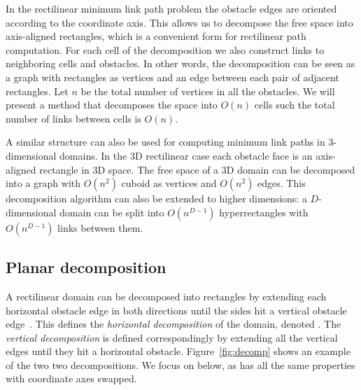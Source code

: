 \documentclass[english,gradu]{tktltiki2018}
\begin{document}

In the rectilinear minimum link path problem the obstacle edges are oriented according to the coordinate axis.
This allows us to decompose the free space into axis-aligned rectangles, which is a convenient form for rectilinear path computation.
For each cell of the decomposition we also construct links to neighboring cells and obstacles.
In other words, the decomposition can be seen as a graph with rectangles as vertices and an edge between each pair of adjacent rectangles.
Let $n$ be the total number of vertices in all the obstacles.
We will present a method that decomposes the space into $O(n)$ cells such the total number of links between cells is $O(n)$.

A similar structure can also be used for computing minimum link paths in 3-dimensional domains.
In the 3D rectilinear case each obstacle face is an axis-aligned rectangle in 3D space.
The free space of a 3D domain can be decomposed into a graph with $O(n^2)$ cuboid as vertices and $O(n^2)$ edges.
This decomposition algorithm can also be extended to higher dimensions: a $D$-dimensional domain can be split into $O(n^{D-1})$ hyperrectangles with $O(n^{D-1})$ links between them.

\subsection{Planar decomposition}\label{sec:decomp2d}

A rectilinear domain can be decomposed into rectangles by extending each horizontal obstacle edge in both directions until the sides hit a vertical obstacle edge~\cite{imai86}.
This defines the \emph{horizontal decomposition} of the domain, denoted .
The \emph{vertical decomposition}  is defined correspondingly by extending all the vertical edges until they hit a horizontal obstacle.
Figure~\ref{fig:decomp} shows an example of the two two decompositions.
We focus on  below, as  has all the same properties with coordinate axes swapped.
\end{document}
